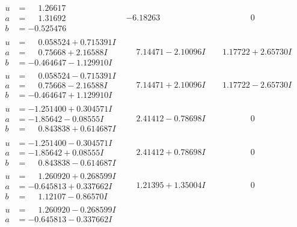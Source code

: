 \documentclass[1p]{elsarticle_modified}
\theoremstyle{definition}
\begin{document}
$$\begin{array}{c|c|c}
\begin{aligned}
u &= \phantom{-}1.26617\phantom{ +0.000000I} \\
a &= \phantom{-}1.31692\phantom{ +0.000000I} \\
b &= -0.525476\phantom{ +0.000000I}\end{aligned}
 & -6.18263\phantom{ +0.000000I} & \phantom{-0.000000 } 0 \\ \hline\begin{aligned}
u &= \phantom{-}0.058524 + 0.715391 I \\
a &= \phantom{-}0.75668 + 2.16588 I \\
b &= -0.464647 - 1.129910 I\end{aligned}
 & \phantom{-}7.14471 - 2.10096 I & \phantom{-}1.17722 + 2.65730 I \\ \hline\begin{aligned}
u &= \phantom{-}0.058524 - 0.715391 I \\
a &= \phantom{-}0.75668 - 2.16588 I \\
b &= -0.464647 + 1.129910 I\end{aligned}
 & \phantom{-}7.14471 + 2.10096 I & \phantom{-}1.17722 - 2.65730 I \\ \hline\begin{aligned}
u &= -1.251400 + 0.304571 I \\
a &= -1.85642 - 0.08555 I \\
b &= \phantom{-}0.843838 + 0.614687 I\end{aligned}
 & \phantom{-}2.41412 - 0.78698 I & \phantom{-0.000000 } 0 \\ \hline\begin{aligned}
u &= -1.251400 - 0.304571 I \\
a &= -1.85642 + 0.08555 I \\
b &= \phantom{-}0.843838 - 0.614687 I\end{aligned}
 & \phantom{-}2.41412 + 0.78698 I & \phantom{-0.000000 } 0 \\ \hline\begin{aligned}
u &= \phantom{-}1.260920 + 0.268599 I \\
a &= -0.645813 + 0.337662 I \\
b &= \phantom{-}1.12107 - 0.86570 I\end{aligned}
 & \phantom{-}1.21395 + 1.35004 I & \phantom{-0.000000 } 0 \\ \hline\begin{aligned}
u &= \phantom{-}1.260920 - 0.268599 I \\
a &= -0.645813 - 0.337662 I \\

\end{aligned}
\end{array}$$
\end{document}
